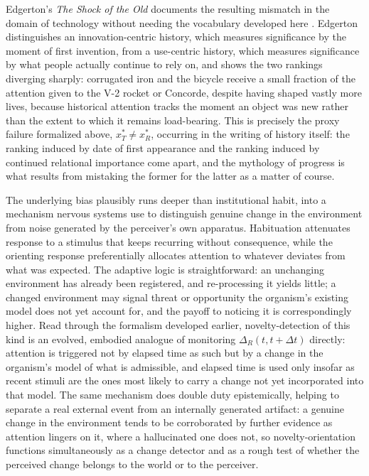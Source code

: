 \documentclass[11pt]{article}
\begin{document}
Edgerton's \emph{The Shock of the Old} documents the resulting mismatch in the domain of technology without needing the vocabulary developed here \cite{edgerton2006}. Edgerton distinguishes an innovation-centric history, which measures significance by the moment of first invention, from a use-centric history, which measures significance by what people actually continue to rely on, and shows the two rankings diverging sharply: corrugated iron and the bicycle receive a small fraction of the attention given to the V-2 rocket or Concorde, despite having shaped vastly more lives, because historical attention tracks the moment an object was new rather than the extent to which it remains load-bearing. This is precisely the proxy failure formalized above, $x_T^* \neq x_R^*$, occurring in the writing of history itself: the ranking induced by date of first appearance and the ranking induced by continued relational importance come apart, and the mythology of progress is what results from mistaking the former for the latter as a matter of course.

The underlying bias plausibly runs deeper than institutional habit, into a mechanism nervous systems use to distinguish genuine change in the environment from noise generated by the perceiver's own apparatus. Habituation attenuates response to a stimulus that keeps recurring without consequence, while the orienting response preferentially allocates attention to whatever deviates from what was expected. The adaptive logic is straightforward: an unchanging environment has already been registered, and re-processing it yields little; a changed environment may signal threat or opportunity the organism's existing model does not yet account for, and the payoff to noticing it is correspondingly higher. Read through the formalism developed earlier, novelty-detection of this kind is an evolved, embodied analogue of monitoring $\Delta_R(t,t+\Delta t)$ directly: attention is triggered not by elapsed time as such but by a change in the organism's model of what is admissible, and elapsed time is used only insofar as recent stimuli are the ones most likely to carry a change not yet incorporated into that model. The same mechanism does double duty epistemically, helping to separate a real external event from an internally generated artifact: a genuine change in the environment tends to be corroborated by further evidence as attention lingers on it, where a hallucinated one does not, so novelty-orientation functions simultaneously as a change detector and as a rough test of whether the perceived change belongs to the world or to the perceiver.
\end{document}
